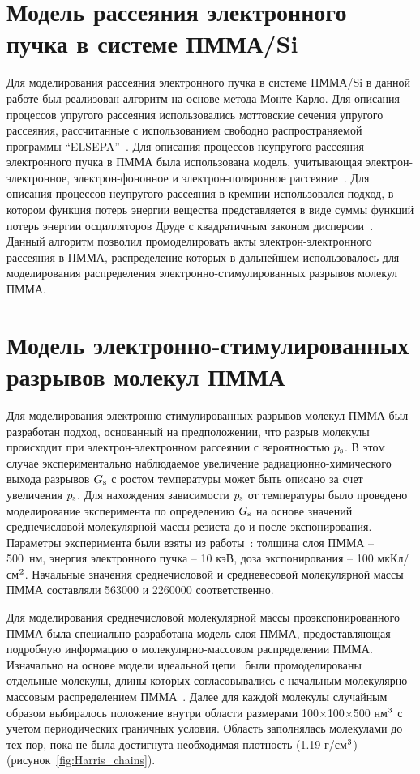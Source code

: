 \section{Модель рассеяния электронного пучка в системе ПММА/Si}

Для моделирования рассеяния электронного пучка в системе ПММА/Si в данной работе был реализован алгоритм на основе метода Монте-Карло.
Для описания процессов упругого рассеяния использовались моттовские сечения упругого рассеяния, рассчитанные с использованием свободно распространяемой программы ``ELSEPA''~\cite{ELSEPA}.
Для описания процессов неупругого рассеяния электронного пучка в ПММА была использована модель, учитывающая электрон-электронное, электрон-фононное и электрон-поляронное рассеяние~\cite{Ciappa_2010}. Для описания процессов неупругого рассеяния в кремнии использовался подход, в котором функция потерь энергии вещества представляется в виде суммы функций потерь энергии осцилляторов Друде с квадратичным законом дисперсии~\cite{Valentin2012_Si}.
Данный алгоритм позволил промоделировать акты электрон-электронного рассеяния в \linebreak ПММА, распределение которых в дальнейшем использовалось для моделирования распределения электронно-стимулированных разрывов молекул ПММА.

\section{Модель электронно-стимулированных разрывов молекул ПММА}
Для моделирования электронно-стимулированных разрывов молекул \linebreak ПММА был разработан подход, основанный на предположении, что разрыв молекулы происходит при электрон-электронном рассеянии с вероятностью $p_\mathrm{s}$.
В этом случае экспериментально наблюдаемое увеличение радиационно-химического выхода разрывов $G_\mathrm{s}$ с ростом температуры может быть описано за счет увеличения $p_\mathrm{s}$.
Для нахождения зависимости $p_\mathrm{s}$ от температуры было проведено моделирование эксперимента по определению $G_\mathrm{s}$ на основе значений среднечисловой молекулярной массы резиста до и после экспонирования.
Параметры эксперимента были взяты из работы~\cite{Harris_G_value}: толщина слоя ПММА -- 500~нм, энергия электронного пучка -- 10 кэВ, доза экспонирования -- 100 мкКл/см$^\text{2}$. Начальные значения среднечисловой и средневесовой молекулярной массы ПММА составляли 563000 и 2260000 соответственно.

Для моделирования среднечисловой молекулярной массы проэкспонированного ПММА была специально разработана модель слоя ПММА, предоставляющая подробную информацию о молекулярно-массовом распределении \linebreak ПММА.
Изначально на основе модели идеальной цепи~\cite{Han_2003} были промоделированы отдельные молекулы, длины которых согласовывались с начальным молекулярно-массовым распределением ПММА~\cite{Harris_G_value}.
Далее для каждой молекулы случайным образом выбиралось положение внутри области размерами 100$\times$100$\times$500 нм$^\text{3}$ с учетом периодических граничных условия.
Область заполнялась молекулами до тех пор, пока не была достигнута необходимая плотность (1.19 г/см$^\text{3}$) (рисунок~\ref{fig:Harris_chains}).

